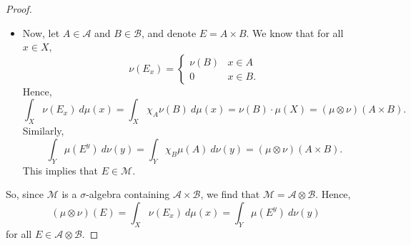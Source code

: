 \documentclass[a4paper, openany]{memoir}
\theoremstyle{definition}
\theoremstyle{plain}
\begin{document}
\begin{proof}
\begin{itemize}
            \item Now, let $A \in \mathcal{A}$ and $B \in \mathcal{B}$, and denote $E = A \times B$. We know that for all $x \in X$,
            \[\nu(E_x) = \begin{cases}
                \nu(B) & x \in A \\
                0 & x \in B.
            \end{cases}\]
            Hence,
            \[\int_X \nu (E_x) \ d\mu(x) = \int_X \chi_A \nu(B) \ d\mu(x) = \nu(B) \cdot \mu(X) = (\mu \otimes \nu)(A \times B).\]
            Similarly,
            \[\int_Y \mu(E^y) \ d\nu(y) = \int_Y \chi_B \mu(A) \ d\nu(y) = (\mu \otimes \nu)(A \times B).\]
            This implies that $E \in \mathcal{M}$.
        \end{itemize}
        So, since $\mathcal{M}$ is a $\sigma$-algebra containing $\mathcal{A} \times \mathcal{B}$, we find that $\mathcal{M} = \mathcal{A} \otimes \mathcal{B}$. Hence, 
        \[(\mu \otimes \nu)(E) = \int_X \nu(E_x) \ d\mu(x) = \int_Y \mu(E^y) \ d\nu(y)\]
        for all $E \in \mathcal{A} \otimes \mathcal{B}$.
    \end{proof}
\end{document}
